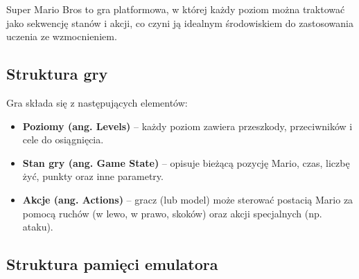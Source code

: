 Super Mario Bros to gra platformowa, w której każdy poziom można traktować jako sekwencję stanów i akcji, co czyni ją idealnym środowiskiem do zastosowania uczenia ze wzmocnieniem.

\subsection{Struktura gry}

Gra składa się z następujących elementów:
\begin{itemize}
    \item \textbf{Poziomy (ang. Levels)} – każdy poziom zawiera przeszkody, przeciwników i cele do osiągnięcia.
    \item \textbf{Stan gry (ang. Game State)} – opisuje bieżącą pozycję Mario, czas, liczbę żyć, punkty oraz inne parametry.
    \item \textbf{Akcje (ang. Actions)} – gracz (lub model) może sterować postacią Mario za pomocą ruchów (w lewo, w prawo, skoków) oraz akcji specjalnych (np. ataku).
\end{itemize}

\subsection{Struktura pamięci emulatora}

